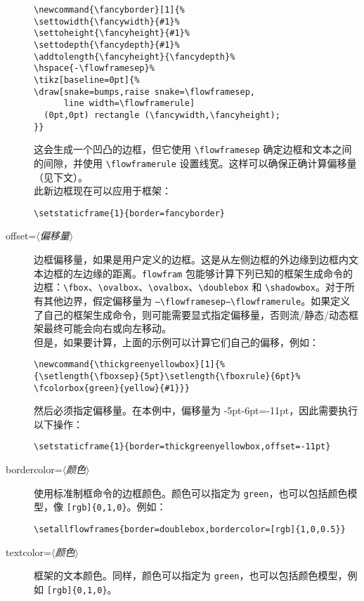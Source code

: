 \documentclass[a4paper]{book}%
\newcommand{\sty}[1]{\texttt{#1}}
\newcommand{\meta}[1]{\textnormal{\ensuremath{\langle}\makebox[0pt][l]{}\emph{#1}\makebox[0pt][l]{}\ensuremath{\rangle}}}
\begin{document}
\begin{description}
\begin{lstlisting}[backgroundcolor=\color{white}]
\newcommand{\fancyborder}[1]{%
\settowidth{\fancywidth}{#1}%
\settoheight{\fancyheight}{#1}%
\settodepth{\fancydepth}{#1}%
\addtolength{\fancyheight}{\fancydepth}%
\hspace{-\flowframesep}%
\tikz[baseline=0pt]{%
\draw[snake=bumps,raise snake=\flowframesep,
      line width=\flowframerule]
  (0pt,0pt) rectangle (\fancywidth,\fancyheight);
}}
\end{lstlisting}
    这会生成一个凹凸的边框，但它使用 \verb|\flowframesep| 确定边框和文本之间的间隙，并使用 \verb|\flowframerule| 设置线宽。这样可以确保正确计算偏移量（见下文）。\\
    此新边框现在可以应用于框架：
    \begin{mdframed}[backgroundcolor=white]
        \verb|\setstaticframe{1}{border=fancyborder}|
    \end{mdframed}
    \item[offset=\meta{偏移量}] 边框偏移量，如果是用户定义的边框。这是从左侧边框的外边缘到边框内文本边框的左边缘的距离。\sty{flowfram} 包能够计算下列已知的框架生成命令的边框：\verb|\fbox|、\verb|\ovalbox|、\verb|\ovalbox|、\verb|\doublebox| 和 \verb|\shadowbox|。对于所有其他边界，假定偏移量为 \verb|–\flowframesep–\flowframerule|。如果定义了自己的框架生成命令，则可能需要显式指定偏移量，否则流/静态/动态框架最终可能会向右或向左移动。\\
    但是，如果要计算，上面的示例可以计算它们自己的偏移，例如：
\begin{lstlisting}[backgroundcolor=\color{white}]
\newcommand{\thickgreenyellowbox}[1]{%
{\setlength{\fboxsep}{5pt}\setlength{\fboxrule}{6pt}%
\fcolorbox{green}{yellow}{#1}}}
\end{lstlisting}
    然后必须指定偏移量。在本例中，偏移量为 -5pt-6pt=-11pt，因此需要执行以下操作：
    \begin{mdframed}[backgroundcolor=white]
        \verb|\setstaticframe{1}{border=thickgreenyellowbox,offset=-11pt}|
    \end{mdframed}
    \item[bordercolor=\meta{颜色}] 使用标准制框命令的边框颜色。颜色可以指定为 \verb|green|，也可以包括颜色模型，像 \verb|[rgb]{0,1,0}|。例如：
    \begin{mdframed}[backgroundcolor=white]
        \verb|\setallflowframes{border=doublebox,bordercolor=[rgb]{1,0,0.5}}|
    \end{mdframed}
    \item[textcolor=\meta{颜色}] 框架的文本颜色。同样，颜色可以指定为 \verb|green|，也可以包括颜色模型，例如 \verb|[rgb]{0,1,0}|。

\end{description}
\end{document}
